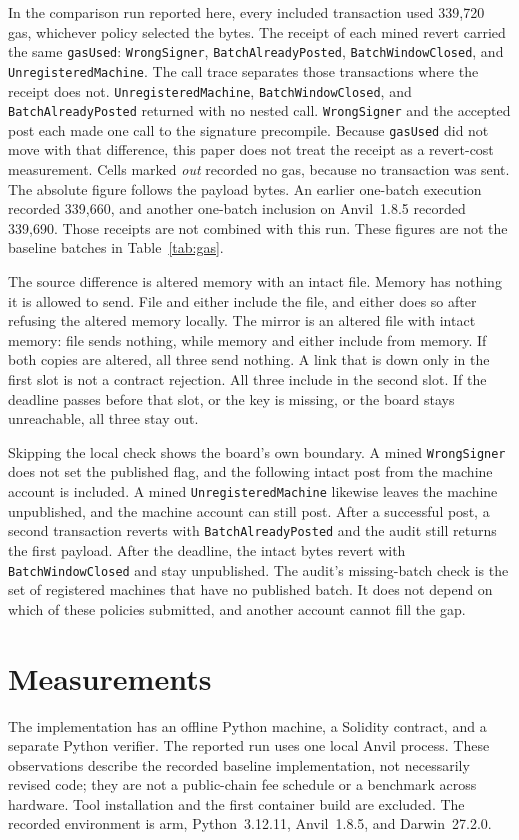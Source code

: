 \documentclass[11pt]{article}
\begin{document}
In the comparison run reported here, every included transaction used 339{,}720 gas, whichever policy selected the bytes. The receipt of each mined revert carried the same \texttt{gasUsed}: \texttt{WrongSigner}, \texttt{BatchAlreadyPosted}, \texttt{BatchWindowClosed}, and \texttt{UnregisteredMachine}. The call trace separates those transactions where the receipt does not. \texttt{UnregisteredMachine}, \texttt{BatchWindowClosed}, and \texttt{BatchAlreadyPosted} returned with no nested call. \texttt{WrongSigner} and the accepted post each made one call to the signature precompile. Because \texttt{gasUsed} did not move with that difference, this paper does not treat the receipt as a revert-cost measurement. Cells marked \emph{out} recorded no gas, because no transaction was sent. The absolute figure follows the payload bytes. An earlier one-batch execution recorded 339{,}660, and another one-batch inclusion on Anvil~1.8.5 recorded 339{,}690. Those receipts are not combined with this run. These figures are not the baseline batches in Table~\ref{tab:gas}.

The source difference is altered memory with an intact file. Memory has nothing it is allowed to send. File and either include the file, and either does so after refusing the altered memory locally. The mirror is an altered file with intact memory: file sends nothing, while memory and either include from memory. If both copies are altered, all three send nothing. A link that is down only in the first slot is not a contract rejection. All three include in the second slot. If the deadline passes before that slot, or the key is missing, or the board stays unreachable, all three stay out.

Skipping the local check shows the board's own boundary. A mined \texttt{WrongSigner} does not set the published flag, and the following intact post from the machine account is included. A mined \texttt{UnregisteredMachine} likewise leaves the machine unpublished, and the machine account can still post. After a successful post, a second transaction reverts with \texttt{BatchAlreadyPosted} and the audit still returns the first payload. After the deadline, the intact bytes revert with \texttt{BatchWindowClosed} and stay unpublished. The audit's missing-batch check is the set of registered machines that have no published batch. It does not depend on which of these policies submitted, and another account cannot fill the gap.

\section{Measurements}
The implementation has an offline Python machine, a Solidity contract, and a separate Python verifier. The reported run uses one local Anvil process. These observations describe the recorded baseline implementation, not necessarily revised code; they are not a public-chain fee schedule or a benchmark across hardware. Tool installation and the first container build are excluded. The recorded environment is arm, Python~3.12.11, Anvil~1.8.5, and Darwin~27.2.0.
\end{document}
